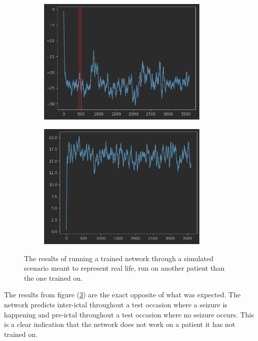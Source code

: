 \begin{figure}[H]
\centering
\begin{subfigure}{0.5\textwidth}
  \centering
  \includegraphics[width=0.9\textwidth]{images/f3-1.png}
  \caption{}
  \label{other_sub1}
\end{subfigure}%
\begin{subfigure}{0.5\textwidth}
  \centering
  \includegraphics[width=0.9\textwidth]{images/f3-2.png}
  \caption{}
  \label{other_sub2}
\end{subfigure}
\caption{The results of running a trained network through a simulated scenario meant to represent real life, run on another patient than the one trained on.}
\label{other_both}
\end{figure}

The results from figure (\ref{other_both}) are the exact opposite of what was expected. The network predicts inter-ictal throughout a test occasion where a seizure is happening and pre-ictal throughout a test occasion where no seizure occurs. This is a clear indication that the network does not work on a patient it has not trained on.

